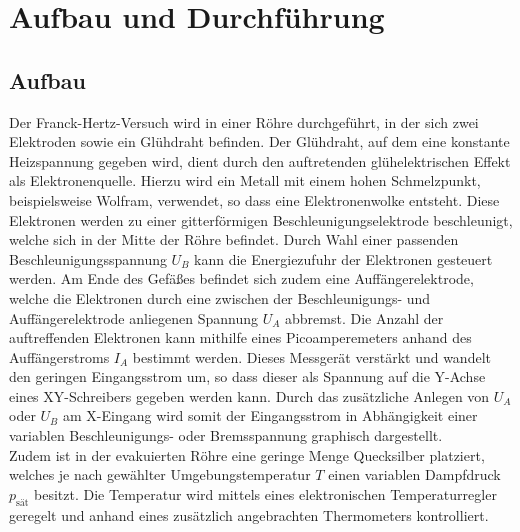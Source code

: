 \section{Aufbau und Durchführung}
\subsection{Aufbau}
\label{sec:Aufbau}

Der Franck-Hertz-Versuch wird in einer Röhre durchgeführt, in der sich zwei Elektroden sowie ein Glühdraht befinden.
Der Glühdraht, auf dem eine konstante Heizspannung gegeben wird, dient durch den auftretenden glühelektrischen Effekt als Elektronenquelle.
Hierzu wird ein Metall mit einem hohen Schmelzpunkt, beispielsweise Wolfram, verwendet, so dass eine Elektronenwolke entsteht.
Diese Elektronen werden zu einer gitterförmigen Beschleunigungselektrode beschleunigt, welche sich in der Mitte der Röhre befindet.
Durch Wahl einer passenden Beschleunigungsspannung $U_B$ kann die Energiezufuhr der Elektronen gesteuert werden.
Am Ende des Gefäßes befindet sich zudem eine Auffängerelektrode, welche die Elektronen durch eine zwischen der Beschleunigungs- und Auffängerelektrode anliegenen Spannung $U_A$ abbremst.
Die Anzahl der auftreffenden Elektronen kann mithilfe eines Picoamperemeters anhand des Auffängerstroms $I_A$ bestimmt werden.
Dieses Messgerät verstärkt und wandelt den geringen Eingangsstrom um, so dass dieser als Spannung auf die Y-Achse eines XY-Schreibers gegeben werden kann.
Durch das zusätzliche Anlegen von $U_A$ oder $U_B$ am X-Eingang wird somit der Eingangsstrom in Abhängigkeit einer variablen Beschleunigungs- oder Bremsspannung graphisch dargestellt.
\\

Zudem ist in der evakuierten Röhre eine geringe Menge Quecksilber platziert, welches je nach gewählter Umgebungstemperatur $T$ einen variablen Dampfdruck $p_\text{sät}$ besitzt.
Die Temperatur wird mittels eines elektronischen Temperaturregler geregelt und anhand eines zusätzlich angebrachten Thermometers kontrolliert.
